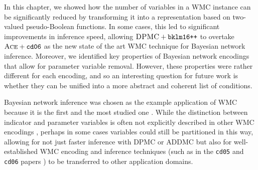 In this chapter, we showed how the number of variables in a WMC instance can be
significantly reduced by transforming it into a representation based on
two-valued pseudo-Boolean functions. In some cases, this led to significant
improvements in inference speed, allowing $\textsc{DPMC} + \texttt{bklm16++}$ to
overtake $\textsc{Ace}+\texttt{cd06}$ as the new state of the art WMC technique
for Bayesian network inference. Moreover, we identified key properties of
Bayesian network encodings that allow for parameter variable removal. However,
these properties were rather different for each encoding, and so an interesting
question for future work is whether they can be unified into a more abstract and
coherent list of conditions.

Bayesian network inference was chosen as the example application of WMC because
it is the first and the most studied one
\citep{DBLP:conf/ecai/BartKLM16,DBLP:conf/ijcai/ChaviraD05,DBLP:conf/sat/ChaviraD06,DBLP:conf/kr/Darwiche02,DBLP:conf/aaai/SangBK05}.
While the distinction between indicator and parameter variables is often not
explicitly described in other WMC encodings
\citep{DBLP:journals/tplp/FierensBRSGTJR15,DBLP:journals/pacmpl/HoltzenBM20,DBLP:conf/icml/XuZFLB18},
perhaps in some cases variables could still be partitioned in this way, allowing
for not just faster inference with \textsc{DPMC} or \textsc{ADDMC} but also for
well-established WMC encoding and inference techniques (such as in the
\texttt{cd05} and \texttt{cd06} papers
\citep{DBLP:conf/ijcai/ChaviraD05,DBLP:conf/sat/ChaviraD06}) to be transferred to
other application domains.
